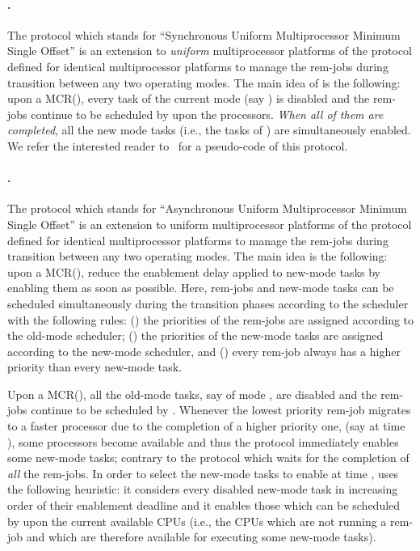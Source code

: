 \documentclass[10pt,english,a4paper]{article}
\newtheorem{validity test}{Validity Test}
\begin{document}
\paragraph{.} The protocol  which stands for ``Synchronous Uniform Multiprocessor Minimum Single Offset'' is an extension to {\em uniform} multiprocessor platforms of the protocol  defined for identical multiprocessor platforms \cite{Nelis1} to manage the rem-jobs during transition between any two operating modes. The main idea of  is the following: upon a MCR(), every task of the current mode (say ) is disabled and the rem-jobs continue to be scheduled by  upon the  processors. \emph{When all of them are completed}, all the new mode tasks (i.e., the tasks of ) are simultaneously enabled. We refer the interested reader to~\cite{Nelis1} for a pseudo-code of this protocol.

\paragraph{.} The protocol  which stands for ``Asynchronous Uniform Multiprocessor Minimum Single Offset'' is an extension to uniform multiprocessor platforms of the protocol  defined for identical multiprocessor platforms \cite{Nelis1} to manage the rem-jobs during transition between any two operating modes. The main idea is the following: upon a MCR(), reduce the enablement delay applied to new-mode tasks by enabling them as soon as possible. Here, rem-jobs and new-mode tasks can be scheduled simultaneously during the transition phases according to the scheduler  with the following rules: () the priorities of the rem-jobs are assigned according to the old-mode scheduler; () the priorities of the new-mode tasks are assigned according to the new-mode scheduler, and () every rem-job always has a higher priority than every new-mode task.

Upon a MCR(), all the old-mode tasks, say of mode , are disabled and the rem-jobs continue to be scheduled by . Whenever the lowest priority rem-job migrates to a faster processor due to the completion of a higher priority one, (say at time ), some processors become available and thus the protocol  immediately enables some new-mode tasks; contrary to the protocol  which waits for the completion of {\em all} the rem-jobs. In order to select the new-mode tasks to enable at time ,  uses the following heuristic: it considers every disabled new-mode task in increasing order of their enablement deadline and it enables those which can be scheduled by  upon the current available CPUs (i.e., the CPUs which are not running a rem-job and which are therefore available for executing some new-mode tasks). 
\end{document}
